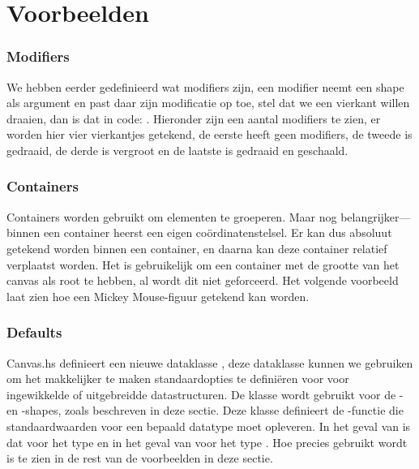 \section{Voorbeelden}
\subsubsection{Modifiers}
We hebben eerder gedefinieerd wat modifiers zijn, een modifier neemt een shape als argument en past daar zijn modificatie op toe, stel dat we een vierkant willen draaien, dan is dat in code: \mbox{.} Hieronder zijn een aantal modifiers te zien, er worden hier vier vierkantjes getekend, de eerste heeft geen modifiers, de tweede is gedraaid, de derde is vergroot en de laatste is gedraaid en geschaald.



\subsubsection{Containers}
Containers worden gebruikt om elementen te groeperen. Maar nog belangrijker—binnen een container heerst een eigen coördinatenstelsel. Er kan dus absoluut getekend worden binnen een container, en daarna kan deze container relatief verplaatst worden. Het is gebruikelijk om een container met de grootte van het canvas als root te hebben, al wordt dit niet geforceerd. Het volgende voorbeeld laat zien hoe een Mickey Mouse-figuur getekend kan worden.



\subsubsection{Defaults} \label{subsubsec:handleiding_defaults}
Canvas.hs definieert een nieuwe dataklasse , deze dataklasse kunnen we gebruiken om het makkelijker te maken standaardopties te definiëren voor voor ingewikkelde of uitgebreidde datastructuren. De klasse wordt gebruikt voor de - en -shapes, zoals beschreven in deze sectie. Deze klasse definieert de -functie die standaardwaarden voor een bepaald datatype moet opleveren. In het geval van  is dat voor het type  en in het geval van  voor het type . Hoe  precies gebruikt wordt is te zien in de rest van de voorbeelden in deze sectie.

